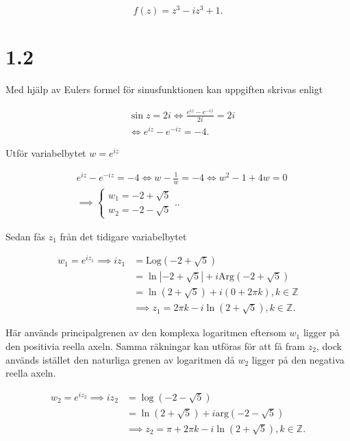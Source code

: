 \documentclass[a4paper]{article}
\begin{document}
\begin{equation*}
	f(z) = z^3 - iz^3 + 1.
\end{equation*}

\section*{1.2}

Med hjälp av Eulers formel för sinusfunktionen kan uppgiften skrivas enligt

\begin{align*}
	&\sin z	= 2i \iff \frac{e^{iz} - e^{-iz}}{2i} = 2i\\
	&\iff e^{iz} - e^{-iz} = -4.
\end{align*}

Utför variabelbytet $w = e^{iz}$

\begin{align*}
	&e^{iz} - e^{-iz} = -4 \iff w - \frac{1}{w} = -4 \iff w^2 - 1 + 4w = 0\\
	&\implies	\begin{cases}
					w_1 = -2 + \sqrt{5}\\
					w_2 = -2 - \sqrt{5}
				\end{cases}..
\end{align*}

Sedan fås $z_1$ från det tidigare variabelbytet

\begin{align*}
	w_1 = e^{iz_1} \implies iz_1 &= \text{Log}(-2 + \sqrt{5})\\
		&= \ln|-2 + \sqrt{5}| + i\text{Arg}(-2 + \sqrt{5})\\
		&= \ln(2+\sqrt{5}) + i(0 + 2\pi k), k \in \mathbb{Z}\\
	 &\implies z_1 = 2\pi k - i\ln(2+\sqrt{5}), k \in \mathbb{Z}.
\end{align*}

Här används principalgrenen av den komplexa logaritmen eftersom $w_1$ ligger på den positivia reella axeln. Samma räkningar kan utföras för att få fram $z_2$, dock används istället den naturliga grenen av logaritmen då $w_2$ ligger på den negativa reella axeln.

\begin{align*}
	w_2 = e^{iz_2} \implies iz_2 &= \log(-2 - \sqrt{5})\\
		&= \ln(2+\sqrt{5}) + i\text{arg}(-2 - \sqrt{5})\\
	 &\implies z_2 = \pi + 2\pi k - i\ln(2 + \sqrt{5}), k \in \mathbb{Z}.
\end{align*}
\end{document}
